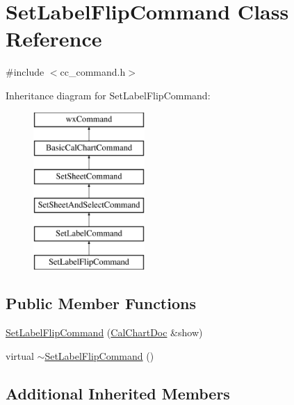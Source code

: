 \hypertarget{a00128}{\section{Set\-Label\-Flip\-Command Class Reference}
\label{a00128}
}


{\ttfamily \#include $<$cc\-\_\-command.\-h$>$}

Inheritance diagram for Set\-Label\-Flip\-Command\-:\begin{figure}[H]
\begin{center}
\leavevmode
\includegraphics[height=6.000000cm]{a00128}
\end{center}
\end{figure}
\subsection*{Public Member Functions}
\begin{DoxyCompactItemize}
\item 
\hyperlink{a00128_af2c276725a03132c073614f2ca99f19f}{Set\-Label\-Flip\-Command} (\hyperlink{a00020}{Cal\-Chart\-Doc} \&show)
\item 
virtual \hyperlink{a00128_ab86ee0a3469a815e43f2e6eb317d1345}{$\sim$\-Set\-Label\-Flip\-Command} ()
\end{DoxyCompactItemize}
\subsection*{Additional Inherited Members}


